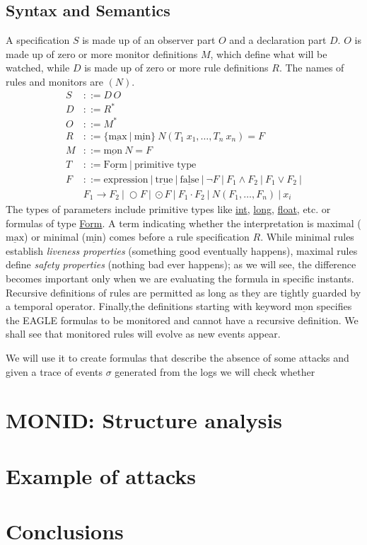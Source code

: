 \documentclass[english]{article}
\begin{document}
\subsection{Syntax and Semantics}
A specification $S$ is made up of an observer part $O$ and a declaration part $D$. $O$ is made up of zero or more monitor definitions $M$, which define what will be watched, while $D$ is made up of zero or more rule definitions $R$. The names of rules and monitors are $(N)$.
\begin{align*}
    S &::= D \, O \\
    D &::= R^* \\
    O &::= M^* \\
    R &::= \{\underline{\text{max}}\ |\ \underline{\text{min}} \}\ N(T_1\ x_1, \ldots, T_n\ x_n) = F \\
    M &::= \underline{\text{mon}}\ N = F \\
    T &::= \underline{\text{Form}}\ |\ \text{primitive type} \\
    F &::= \text{expression}\ |\ \underline{\text{true}}\ |\ \underline{\text{false}}\ |\ \neg F\ |\ F_1 \land F_2\ |\ F_1 \lor F_2\ |\\
            &F_1 \rightarrow F_2\ |\ \bigcirc F\ |\ \odot F\ |\ F_1 \cdot F_2\ |\ N(F_1, \ldots, F_n)\ |\ x_i
\end{align*}
The types of parameters include primitive types like \underline{int}, \underline{long}, \underline{float}, etc. or formulas of type \underline{Form}.
A term indicating whether the interpretation is maximal ($\underline{\text{max}}$) or minimal ($\underline{\text{min}}$) comes before a rule specification $R$. While minimal rules establish \textit{liveness properties} (something good eventually happens), maximal rules define \textit{safety properties} (nothing bad ever happens); as we will see, the difference becomes important only when we are evaluating the formula in specific instants. Recursive definitions of rules are permitted as long as they are tightly guarded by a temporal operator. Finally,the definitions starting with keyword $\underline{\text{mon}}$ specifies the EAGLE formulas to be monitored and cannot have a recursive definition. We shall see that monitored rules will evolve as new events appear.



We will use it to create formulas that describe the absence of some attacks and given a trace of events $\sigma$ generated from the logs we will check whether 

\section{MONID: Structure analysis}

\section{Example of attacks}

\section{Conclusions}

\printbibliography
\end{document}
